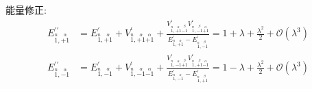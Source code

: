     能量修正:
    \begin{align*}
        E^{\prime\prime}_{\stackrel{n}{1},\stackrel{\alpha}{+1}} &= E^{\prime}_{\stackrel{n}{1},\stackrel{\alpha}{+1}} + V^{\prime}_{\stackrel{n}{1},\stackrel{\alpha}{+1}\stackrel{\alpha}{+1}} + \frac{V^{\prime}_{\stackrel{n}{1},\stackrel{\alpha}{+1}\stackrel{\beta}{-1}}V^{\prime}_{\stackrel{n}{1},\stackrel{\beta}{-1}\stackrel{\alpha}{+1}}}{E^{\prime}_{\stackrel{n}{1},\stackrel{\alpha}{+1}} - E^{\prime}_{\stackrel{n}{1},\stackrel{\beta}{-1}}} = 1 + \lambda + \frac{\lambda^{2}}{2} + \mathcal{O}(\lambda^{3})\\
        E^{\prime\prime}_{\stackrel{n}{1},\stackrel{\alpha}{-1}} &= E^{\prime}_{\stackrel{n}{1},\stackrel{\alpha}{-1}} + V^{\prime}_{\stackrel{n}{1},\stackrel{\alpha}{-1}\stackrel{\alpha}{-1}} + \frac{V^{\prime}_{\stackrel{n}{1},\stackrel{\alpha}{-1}\stackrel{\beta}{+1}}V^{\prime}_{\stackrel{n}{1},\stackrel{\beta}{+1}\stackrel{\alpha}{-1}}}{E^{\prime}_{\stackrel{n}{1},\stackrel{\alpha}{-1}} - E^{\prime}_{\stackrel{n}{1},\stackrel{\beta}{+1}}} = 1 - \lambda + \frac{\lambda^{2}}{2} + \mathcal{O}(\lambda^{3})
    \end{align*}